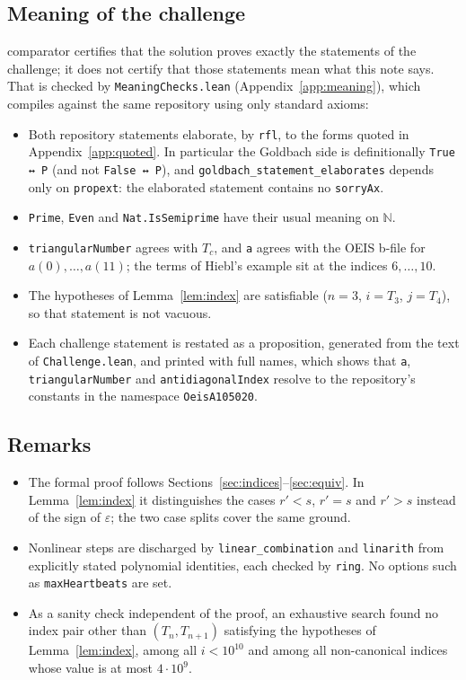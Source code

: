 \documentclass[11pt,a4paper]{article}
\newcommand{\li}{\lstinline[style=inline]}
\theoremstyle{plain}
\theoremstyle{remark}
\begin{document}
{\subsection{Meaning of the challenge}\label{sec:meaning}

comparator certifies that the solution proves exactly the statements of the challenge;
it does not certify that those statements mean what this note says. That is checked by
\li{MeaningChecks.lean} (Appendix~\ref{app:meaning}), which compiles against the same
repository using only standard axioms:
\begin{itemize}
\item Both repository statements elaborate, by \li{rfl}, to the forms quoted in
  Appendix~\ref{app:quoted}. In particular the Goldbach side is definitionally
  \li{True ↔ P} (and not \li{False ↔ P}), and \li{goldbach_statement_elaborates}
  depends only on \li{propext}: the elaborated statement contains no \li{sorryAx}.
\item \li{Prime}, \li{Even} and \li{Nat.IsSemiprime} have their usual meaning on
  $\mathbb{N}$.
\item \li{triangularNumber} agrees with $T_c$, and \li{a} agrees with the OEIS b-file
  for $a(0), \dots, a(11)$; the terms of Hiebl's example sit at the indices
  $6, \dots, 10$.
\item The hypotheses of Lemma~\ref{lem:index} are satisfiable ($n = 3$, $i = T_3$,
  $j = T_4$), so that statement is not vacuous.
\item Each challenge statement is restated as a proposition, generated from the text of
  \li{Challenge.lean}, and printed with full names, which shows that \li{a},
  \li{triangularNumber} and \li{antidiagonalIndex} resolve to the repository's
  constants in the namespace \li{OeisA105020}.
\end{itemize}

\subsection{Remarks}

\begin{itemize}
\item The formal proof follows Sections~\ref{sec:indices}--\ref{sec:equiv}. In
  Lemma~\ref{lem:index} it distinguishes the cases $r' < s$, $r' = s$ and $r' > s$
  instead of the sign of $\varepsilon$; the two case splits cover the same ground.
\item Nonlinear steps are discharged by \li{linear_combination} and \li{linarith} from
  explicitly stated polynomial identities, each checked by \li{ring}. No options such as
  \li{maxHeartbeats} are set.
\item As a sanity check independent of the proof, an exhaustive search found no index
  pair other than $(T_n, T_{n+1})$ satisfying the hypotheses of
  Lemma~\ref{lem:index}, among all $i < 10^{10}$ and among all non-canonical indices
  whose value is at most $4 \cdot 10^{9}$.
\end{itemize}

}
\end{document}
